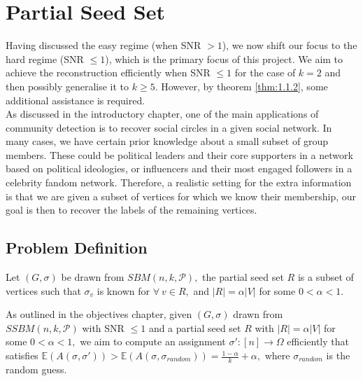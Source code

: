 \chapter{Partial Seed Set}\label{chapter:3}
Having discussed the easy regime (when SNR $>1$), we now shift our focus to the hard regime (SNR $\leq1$), which is the primary focus of this project. We aim to achieve the reconstruction efficiently when SNR $\leq1$ for the case of $k=2$ and then possibly generalise it to $k\geq 5$. However, by theorem \ref{thm:1.1.2}, some additional assistance is required.\\
As discussed in the introductory chapter, one of the main applications of community detection is to recover social circles in a given social network. In many cases, we have certain prior knowledge about a small subset of group members. These could be political leaders and their core supporters in a network based on political ideologies, or influencers and their most engaged followers in a celebrity fandom network. Therefore, a realistic setting for the extra information is that we are given a subset of vertices for which we know their membership, our goal is then to recover the labels of the remaining vertices.

\section{Problem Definition}
\begin{definition} \label{def: partial seed set}
    Let $(G, \sigma)$ be drawn from $SBM(n, k, \mathcal{P}),$ the partial seed set $R$ is a subset of vertices such that $\sigma_v$ is known for $\forall~v\in R,$ and $|R| = \alpha|V|$ for some $0<\alpha<1.$
\end{definition}
As outlined in the objectives chapter, given $(G, \sigma)$ drawn from $SSBM(n, k, \mathcal{P})$ with SNR $\leq1$ and a partial seed set $R$ with $|R|=\alpha|V|$ for some $0<\alpha<1,$ we aim to compute an assignment $\sigma': [n]\rightarrow \Omega$ efficiently that satisfies $\mathbb{E}(A(\sigma, \sigma'))> \mathbb{E}(A(\sigma, \sigma_{random}))=\frac{1-\alpha}{k}+\alpha,$ where $\sigma_{random}$ is the random guess.

